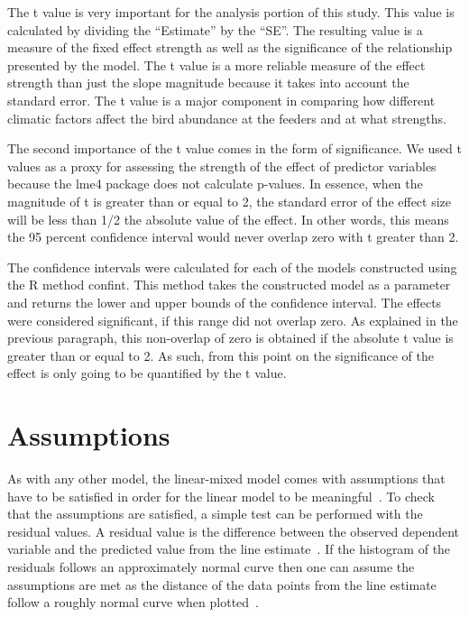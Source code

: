 The t value is very important for the analysis portion of this study. This value is calculated by dividing the ``Estimate'' by the ``SE''. The resulting value is a measure of the fixed effect strength as well as the  significance of the relationship presented by the model. The t value is a more reliable measure of the effect strength than just the slope magnitude because it takes into account the standard error. The t value is a major component in comparing how different climatic factors affect the bird abundance at the feeders and at what strengths.

The second importance of the t value comes in the form of significance. We used t values as a proxy for assessing the strength of the effect of predictor variables because the lme4 package does not calculate p-values. In essence, when the magnitude of t is greater than or equal to 2, the standard error of the effect size will be less than 1/2 the absolute value of the effect. In other words, this means the 95 percent confidence interval would never overlap zero with t greater than 2.

The confidence intervals were calculated for each of the models constructed using the R method confint. This method takes the constructed model as a parameter and returns the lower and upper bounds of the confidence interval. The effects were considered significant, if this range did not overlap zero. As explained in the previous paragraph, this non-overlap of zero is obtained if the absolute t value is greater than or equal to 2. As such, from this point on the significance of the effect is only going to be quantified by the t value.

\section{Assumptions}

As with any other model, the linear-mixed model comes with assumptions that have to be satisfied in order for the linear model to be meaningful~\cite{RLinear:online}. To check that the assumptions are satisfied, a simple test can be performed with the residual values. A residual value is the difference between the observed dependent variable and the predicted value from the line estimate~\cite{Residuals:online}. If the histogram of the residuals follows an approximately normal curve then one can assume the assumptions are met as the distance of the data points from the line estimate follow a roughly normal curve when plotted~\cite{LinRegress:online, LinearAssump:online}.

